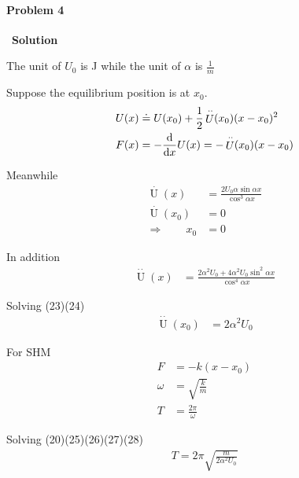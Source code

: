\documentclass[12pt,a4paper]{article}
\begin{document}
\paragraph{\large \textbf{Problem 4}}~{\textbf{Solution}}
\vspace{2mm}
\par The unit of $U_0$ is J while the unit of $\alpha$ is $\frac{1}{m}$
\par Suppose the equilibrium position is at $x_0$.
\begin{align}
    U(x) &\doteq U(x_0) + \frac{1}{2}\mathop{U}\limits^{\cdot\cdot} (x_0) (x-x_0)^2\\
    F(x) &= -\frac{{\rm d}}{{\rm d}x} U(x) = -\mathop{U}\limits^{\cdot\cdot}(x_0) (x-x_0)
\end{align}
\par Meanwhile
\begin{align}
    \mathop{U}\limits^{\cdot}(x) &= \frac{2U_0\alpha\sin\alpha x}{\cos^3\alpha x}\\
    \mathop{U}\limits^{\cdot}(x_0)&= 0\\
\Rightarrow\qquad x_0 &= 0
\end{align}
\par In addition
\begin{align}
    \mathop{U}\limits^{\cdot\cdot}(x) &= \frac{2\alpha^2U_0 + 4\alpha^2U_0\sin^2\alpha x}{\cos^4\alpha x}
\end{align}
\par Solving (23)(24)
\begin{align}
    \mathop{U}\limits^{\cdot\cdot}(x_0) &= 2\alpha^2U_0
\end{align}
\par For SHM
\begin{align}
    F &= -k(x-x_0)\\
    \omega &= \sqrt{\frac{k}{m}}\\
    T &= \frac{2\pi}{\omega}
\end{align}
\par Solving (20)(25)(26)(27)(28)
\begin{align}
    T = 2\pi \sqrt{\frac{m}{2\alpha^2U_0}}
\end{align}
\end{document}
